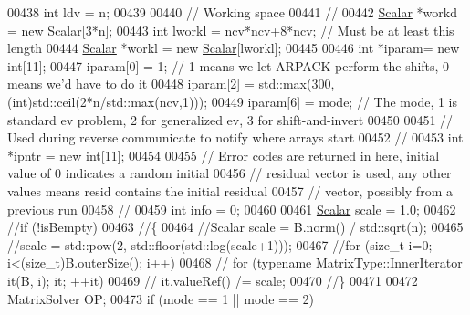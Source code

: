 \begin{DoxyCode}
00438   \textcolor{keywordtype}{int} ldv = n;
00439 
00440   \textcolor{comment}{// Working space}
00441   \textcolor{comment}{//}
00442   \hyperlink{class_eigen_1_1_arpack_generalized_self_adjoint_eigen_solver_ab1182405bfe87a505d4b7a8311c661ec}{Scalar} *workd = \textcolor{keyword}{new} \hyperlink{class_eigen_1_1_arpack_generalized_self_adjoint_eigen_solver_ab1182405bfe87a505d4b7a8311c661ec}{Scalar}[3*n];
00443   \textcolor{keywordtype}{int} lworkl = ncv*ncv+8*ncv; \textcolor{comment}{// Must be at least this length}
00444   \hyperlink{class_eigen_1_1_arpack_generalized_self_adjoint_eigen_solver_ab1182405bfe87a505d4b7a8311c661ec}{Scalar} *workl = \textcolor{keyword}{new} \hyperlink{class_eigen_1_1_arpack_generalized_self_adjoint_eigen_solver_ab1182405bfe87a505d4b7a8311c661ec}{Scalar}[lworkl];
00445 
00446   \textcolor{keywordtype}{int} *iparam= \textcolor{keyword}{new} \textcolor{keywordtype}{int}[11];
00447   iparam[0] = 1; \textcolor{comment}{// 1 means we let ARPACK perform the shifts, 0 means we'd have to do it}
00448   iparam[2] = std::max(300, (\textcolor{keywordtype}{int})std::ceil(2*n/std::max(ncv,1)));
00449   iparam[6] = mode; \textcolor{comment}{// The mode, 1 is standard ev problem, 2 for generalized ev, 3 for shift-and-invert}
00450 
00451   \textcolor{comment}{// Used during reverse communicate to notify where arrays start}
00452   \textcolor{comment}{//}
00453   \textcolor{keywordtype}{int} *ipntr = \textcolor{keyword}{new} \textcolor{keywordtype}{int}[11]; 
00454 
00455   \textcolor{comment}{// Error codes are returned in here, initial value of 0 indicates a random initial}
00456   \textcolor{comment}{// residual vector is used, any other values means resid contains the initial residual}
00457   \textcolor{comment}{// vector, possibly from a previous run}
00458   \textcolor{comment}{//}
00459   \textcolor{keywordtype}{int} info = 0;
00460 
00461   \hyperlink{class_eigen_1_1_arpack_generalized_self_adjoint_eigen_solver_ab1182405bfe87a505d4b7a8311c661ec}{Scalar} scale = 1.0;
00462   \textcolor{comment}{//if (!isBempty)}
00463   \textcolor{comment}{//\{}
00464   \textcolor{comment}{//Scalar scale = B.norm() / std::sqrt(n);}
00465   \textcolor{comment}{//scale = std::pow(2, std::floor(std::log(scale+1)));}
00467 \textcolor{comment}{}  \textcolor{comment}{//for (size\_t i=0; i<(size\_t)B.outerSize(); i++)}
00468   \textcolor{comment}{//    for (typename MatrixType::InnerIterator it(B, i); it; ++it)}
00469   \textcolor{comment}{//        it.valueRef() /= scale;}
00470   \textcolor{comment}{//\}}
00471 
00472   MatrixSolver OP;
00473   \textcolor{keywordflow}{if} (mode == 1 || mode == 2)

\end{DoxyCode}
